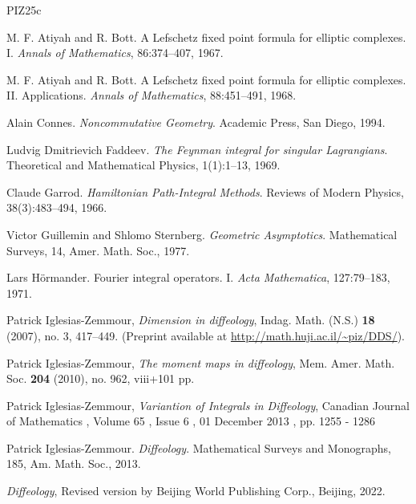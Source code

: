 \documentclass[10pt,reqno,letterpaper,twoside]{amsbook}
\begin{document}
  \begin{thebibliography}{PIZ25c}
    
    M. F. Atiyah and R. Bott.
    A Lefschetz fixed point formula for elliptic complexes. I.
    {\em Annals of Mathematics}, 86:374--407, 1967.
    
    M. F. Atiyah and R. Bott.
    A Lefschetz fixed point formula for elliptic complexes. II. Applications.
    {\em Annals of Mathematics}, 88:451--491, 1968.
    
    Alain Connes.
    {\em Noncommutative Geometry}.
    Academic Press, San Diego, 1994.
    
    Ludvig Dmitrievich Faddeev.
    \emph{The Feynman integral for singular Lagrangians}.
    Theoretical and Mathematical Physics, 1(1):1--13, 1969.
    
    Claude Garrod.
    \emph{Hamiltonian Path-Integral Methods}.
    Reviews of Modern Physics,
    38(3):483--494,
    1966.
    
    Victor Guillemin and Shlomo Sternberg.
    \emph{Geometric Asymptotics}.
    Mathematical Surveys, 14, Amer. Math. Soc., 1977.
    
    Lars H\"ormander.
    Fourier integral operators. I.
    {\em Acta Mathematica}, 127:79--183, 1971.
    
    Patrick Iglesias-Zemmour,
    \emph{Dimension in diffeology},
    Indag. Math. (N.S.) \textbf{18} (2007), no. 3, 417--449. (Preprint available at \url{http://math.huji.ac.il/~piz/DDS/}).
    
    Patrick Iglesias-Zemmour,
    \emph{The moment maps in diffeology},
    Mem. Amer. Math. Soc. \textbf{204} (2010), no. 962, viii+101 pp.
    
    Patrick Iglesias-Zemmour,
    \emph{Variantion of Integrals in Diffeology},
    Canadian Journal of Mathematics , Volume 65 , Issue 6 , 01 December 2013 , pp. 1255 - 1286
    
    Patrick Iglesias-Zemmour.
    {\em Diffeology}.
    Mathematical Surveys and Monographs, 185, Am. Math. Soc., 2013.
    
    \bysame %
    \emph{Diffeology},
    Revised version by Beijing World Publishing Corp., Beijing, 2022.
    

\end{thebibliography}
\end{document}
